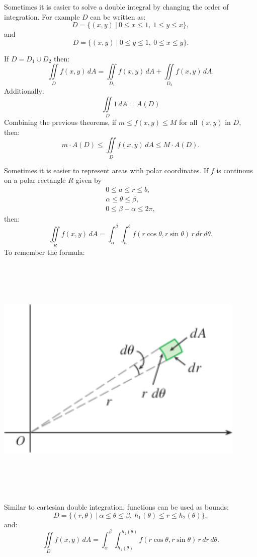 \documentclass{article}
\begin{document}
Sometimes it is easier to solve a double integral by changing the order
of integration. For example $D$ can be written as:
\[
D = \{(x,y) \ | \ 0 \le x \le 1, \ 1 \le y \le x\},
\]
and
\[
    D = \{(x,y) \ | \ 0 \le y \le 1, \ 0 \le x \le y\}.
\]


If $D = D_1 \cup D_2$ then:
\[
\iint \limits_D f(x,y) \, dA = \iint \limits_{D_1} f(x,y) \, dA + \iint \limits_{D_2} f(x,y) \, dA.
\]
Additionally:
\[
\iint \limits_D 1 \, dA = A(D)
\]
Combining the previous theorems, if $m \le f(x,y) \le M$ for all $(x,y)$ in $D$,
then:
\[
m \cdot A(D) \le \iint \limits_D f(x,y) \, dA \le M \cdot A(D). 
\]

Sometimes it is easier to represent areas with polar coordinates. If 
$f$ is continous on a polar rectangle $R$ given by
\begin{align}
0 \le a \le r \le b, \nonumber \\ 
\alpha \le \theta \le \beta, \nonumber \\
0 \le \beta - \alpha \le 2\pi \nonumber,
\end{align}
then:
\[
\iint \limits_R f(x,y)\, dA = \int_{\alpha}^{\beta} \int_{a}^{b} f(r\cos\theta, r\sin\theta) \, r \, dr \, d\theta.
\]
To remember the formula:
\begin{center}
    \includegraphics[width=12cm,height=12cm, keepaspectratio]{Images/PolarDoubleIntegration.png}
\end{center}

Similar to cartesian double integration, functions can be used as bounds:
\[
D = \{(r,\theta) \ | \ \alpha \le \theta \le \beta, \ h_1(\theta) \le r \le h_2(\theta)\},  
\]
and:
\[
\iint \limits_D f(x,y) \, dA  = \int_{\alpha}^{\beta} \int_{h_1(\theta)}^{h_2(\theta)} f(r\cos\theta, r\sin\theta) \, r \, dr \, d\theta.
\]
\end{document}
